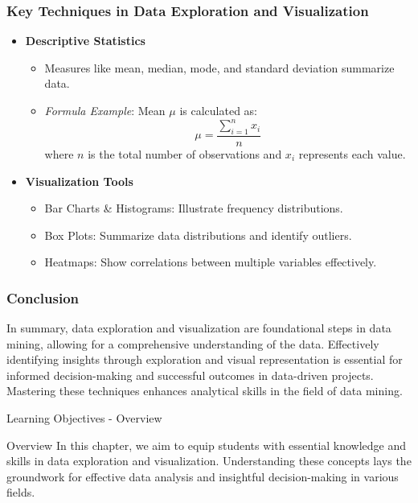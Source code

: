 \documentclass[aspectratio=169]{beamer}
\begin{document}
\begin{frame}[fragile]
    \frametitle{Key Techniques in Data Exploration and Visualization}
    \begin{itemize}
        \item \textbf{Descriptive Statistics}
        \begin{itemize}
            \item Measures like mean, median, mode, and standard deviation summarize data.
            \item \textit{Formula Example}: Mean \( \mu \) is calculated as:
            \begin{equation}
                \mu = \frac{\sum_{i=1}^{n} x_i}{n}
            \end{equation}
            where \( n \) is the total number of observations and \( x_i \) represents each value.
        \end{itemize}

        \item \textbf{Visualization Tools}
        \begin{itemize}
            \item Bar Charts \& Histograms: Illustrate frequency distributions.
            \item Box Plots: Summarize data distributions and identify outliers.
            \item Heatmaps: Show correlations between multiple variables effectively.
        \end{itemize}
    \end{itemize}
\end{frame}

\begin{frame}[fragile]
    \frametitle{Conclusion}
    In summary, data exploration and visualization are foundational steps in data mining, allowing for a comprehensive understanding of the data. Effectively identifying insights through exploration and visual representation is essential for informed decision-making and successful outcomes in data-driven projects. Mastering these techniques enhances analytical skills in the field of data mining.
\end{frame}

\begin{frame}[fragile]{Learning Objectives - Overview}
    \begin{block}{Overview}
        In this chapter, we aim to equip students with essential knowledge and skills in data exploration and visualization. Understanding these concepts lays the groundwork for effective data analysis and insightful decision-making in various fields.
    \end{block}
\end{frame}
\end{document}
